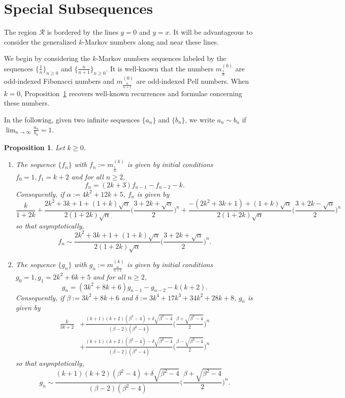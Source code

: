 \documentclass{article}
\newtheorem{prop}[theorem]{Proposition}
\theoremstyle{remark}
\begin{document}
\section{Special Subsequences}\label{sec:Sequences}

The region $\mathcal{R}$ is bordered by the lines $y =0$ and $y = x$.  It will be advantageous to consider the generalized $k$-Markov numbers along and near these lines. 

We begin by considering the $k$-Markov numbers sequences labeled by the sequences $\{\frac{1}{n}\}_{n \geq 0}$ and $\{\frac{n}{n+1}\}_{n \geq 0}$. It is well-known that the numbers $m^{(0)}_{\frac1n}$ are odd-indexed Fibonacci numbers and $m^{(0)}_{\frac{n}{n+1}}$ are odd-indexed Pell numbers. When $k = 0$, Proposition~\ref{prop:kMarkovFibAndPell} recovers well-known recurrences and formulae concerning these numbers.

In the following, given two infinite sequences $\{a_n\}$ and $\{b_n\}$, we write $a_n \sim b_n$ if $\lim_{n \to \infty} \frac{a_n}{b_n} = 1$.

\begin{prop}\label{prop:kMarkovFibAndPell}
Let $k \geq 0$.
\begin{enumerate}[label = (\arabic*)]
    \item The sequence $\{f_n\}$ with $f_n:= m_{\frac1n}^{(k)}$ is given by initial conditions $f_0 = 1, f_1 = k+2$ and for all $n \geq 2$, \[
f_{n} = ( 2k+3)f_{n-1} - f_{n-2} - k.
    \]
Consequently, if $\alpha:= 4k^2 + 12k + 5$, $f_n$ is given by \[
\frac{k}{1+2k} + \frac{2k^2 + 3k + 1 + (1+k)\sqrt{\alpha}}{2(1+2k)\sqrt{\alpha}} \bigg(\frac{3 + 2k + \sqrt{\alpha}}{2}\bigg)^n + \frac{-(2k^2 + 3k + 1) + (1+k)\sqrt{\alpha}}{2(1+2k)\sqrt{\alpha}} \bigg(\frac{3 + 2k - \sqrt{\alpha}}{2}\bigg)^n
\]
so that asymptotically,\[
f_n \sim \frac{2k^2 + 3k + 1 + (1+k)\sqrt{\alpha}}{2(1+2k)\sqrt{\alpha}} \bigg(\frac{3 + 2k + \sqrt{\alpha}}{2}\bigg)^n.
\]
\item The sequence $\{g_n\}$ with $g_n:= m_{\frac{n}{n+1}}^{(k)}$ is given by initial conditions $g_0 = 1, g_1 = 2k^2 + 6k + 5$ and for all $n \geq 2$, \[
g_{n} = (3k^2 + 8k + 6 )g_{n-1} - g_{n-2} - k(k+2).
    \]
Consequently, if $\beta:= 3k^2 + 8k + 6$ and $\delta:= 3k^4 + 17k^3 + 34 k^2 + 28k + 8$, $g_n$ is given by \begin{align*}
\frac{k}{3k+2} &+ \frac{(k+1)(k+2)(\beta^2 - 4) + \delta \sqrt{\beta^2 - 4}}{(\beta-2)(\beta^2 - 4)}\bigg(\frac{\beta + \sqrt{\beta^2 - 4}}{2}\bigg)^n\\& + \frac{(k+1)(k+2)(\beta^2 - 4) -\delta \sqrt{\beta^2 - 4}}{(\beta-2)(\beta^2 - 4)}\bigg(\frac{\beta - \sqrt{\beta^2 - 4}}{2}\bigg)^n
\end{align*}
so that asymptotically, \[
g_n \sim \frac{(k+1)(k+2)(\beta^2 - 4) + \delta \sqrt{\beta^2 - 4}}{(\beta-2)(\beta^2 - 4)}\bigg(\frac{\beta + \sqrt{\beta^2 - 4}}{2}\bigg)^n.
\]
\end{enumerate}
\end{prop}
\end{document}
